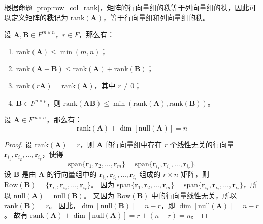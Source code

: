 \begin{definition}
    根据命题 \ref{prop:row_col_rank}，矩阵的行向量组的秩等于列向量组的秩，因此可以定义矩阵的\textbf{秩}记为 $\mathrm{rank}(\mathbf{A})$，等于行向量组和列向量组的秩。
\end{definition}

\begin{proposition}[矩阵秩的性质]
    设 $\mathbf{A},\mathbf{B} \in F^{m \times n}$，$r\in F$，那么有：
    \begin{enumerate}
        \item $\mathrm{rank}(\mathbf{A}) \leq \min(m,n)$；
        \item $\mathrm{rank}(\mathbf{A} + \mathbf{B}) \leq \mathrm{rank}(\mathbf{A}) + \mathrm{rank}(\mathbf{B})$；
        \item $\mathrm{rank}(r\mathbf{A}) = \mathrm{rank}(\mathbf{A})$，其中 $r\neq 0$；
        \item $\mathbf{B} \in F^{n \times p}$，则 $\mathrm{rank}(\mathbf{A}\mathbf{B}) \leq \min(\mathrm{rank}(\mathbf{A}),\mathrm{rank}(\mathbf{B}))$。
    \end{enumerate}
    \label{prop:matrix_rank_property}
\end{proposition}

\begin{theorem}
    设 $\mathbf{A}\in F^{m \times n}$，那么有：
    \[
        \mathrm{rank}(\mathbf{A}) + \dim[\mathrm{null}(\mathbf{A})] = n
    \]
    \label{thm:rank_nullity_theorem}
\end{theorem}

\begin{proof}
    设 $\mathrm{rank}(\mathbf{A}) = r$，则 $\mathbf{A}$ 的行向量组中存在 $r$ 个线性无关的行向量 $\mathbf{r}_{i_1},\mathbf{r}_{i_2},\ldots,\mathbf{r}_{i_r}$，使得
    \[
        \mathrm{span}\{\mathbf{r}_1,\mathbf{r}_2,\ldots,\mathbf{r}_m\} = \mathrm{span}\{\mathbf{r}_{i_1},\mathbf{r}_{i_2},\ldots,\mathbf{r}_{i_r}\}.
    \]
    设 $\mathbf{B}$ 是由 $\mathbf{A}$ 的行向量组中的 $\mathbf{r}_{i_1},\mathbf{r}_{i_2},\ldots,\mathbf{r}_{i_r}$ 组成的 $r \times n$ 矩阵，则 $\mathrm{Row}(\mathbf{B}) = \{\mathbf{r}_{i_1},\mathbf{r}_{i_2},\ldots,\mathbf{r}_{i_r}\}$。
    因为 $\mathrm{span}\{\mathbf{r}_1,\mathbf{r}_2,\ldots,\mathbf{r}_m\} = \mathrm{span}\{\mathbf{r}_{i_1},\mathbf{r}_{i_2},\ldots,\mathbf{r}_{i_r}\}$，所以 $\mathrm{null}(\mathbf{A}) = \mathrm{null}(\mathbf{B})$。
    又因为 $\mathrm{Row}(\mathbf{B})$ 中的行向量线性无关，所以 $\mathrm{rank}(\mathbf{B}) = r$。
    因此，$\dim[\mathrm{null}(\mathbf{B})] = n - r$，即 $\dim[\mathrm{null}(\mathbf{A})] = n - r$。
    故有 $\mathrm{rank}(\mathbf{A}) + \dim[\mathrm{null}(\mathbf{A})] = r + (n - r) = n$。
\end{proof}

